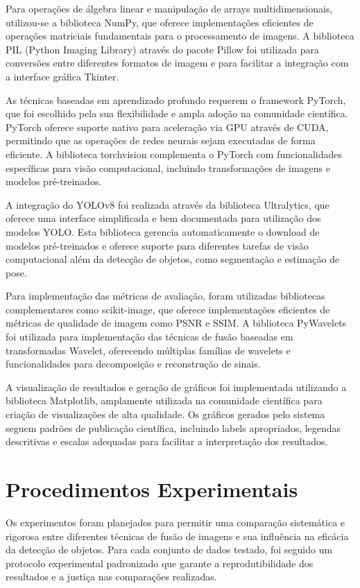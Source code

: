 Para operações de álgebra linear e manipulação de arrays multidimensionais, utilizou-se a biblioteca NumPy, que oferece implementações eficientes de operações matriciais fundamentais para o processamento de imagens. A biblioteca PIL (Python Imaging Library) através do pacote Pillow foi utilizada para conversões entre diferentes formatos de imagem e para facilitar a integração com a interface gráfica Tkinter.

As técnicas baseadas em aprendizado profundo requerem o framework PyTorch, que foi escolhido pela sua flexibilidade e ampla adoção na comunidade científica. PyTorch oferece suporte nativo para aceleração via GPU através de CUDA, permitindo que as operações de redes neurais sejam executadas de forma eficiente. A biblioteca torchvision complementa o PyTorch com funcionalidades específicas para visão computacional, incluindo transformações de imagens e modelos pré-treinados.

A integração do YOLOv8 foi realizada através da biblioteca Ultralytics, que oferece uma interface simplificada e bem documentada para utilização dos modelos YOLO. Esta biblioteca gerencia automaticamente o download de modelos pré-treinados e oferece suporte para diferentes tarefas de visão computacional além da detecção de objetos, como segmentação e estimação de pose.

Para implementação das métricas de avaliação, foram utilizadas bibliotecas complementares como scikit-image, que oferece implementações eficientes de métricas de qualidade de imagem como PSNR e SSIM. A biblioteca PyWavelets foi utilizada para implementação das técnicas de fusão baseadas em transformadas Wavelet, oferecendo múltiplas famílias de wavelets e funcionalidades para decomposição e reconstrução de sinais.

A visualização de resultados e geração de gráficos foi implementada utilizando a biblioteca Matplotlib, amplamente utilizada na comunidade científica para criação de visualizações de alta qualidade. Os gráficos gerados pelo sistema seguem padrões de publicação científica, incluindo labels apropriados, legendas descritivas e escalas adequadas para facilitar a interpretação dos resultados.

\section{Procedimentos Experimentais}

Os experimentos foram planejados para permitir uma comparação sistemática e rigorosa entre diferentes técnicas de fusão de imagens e sua influência na eficácia da detecção de objetos. Para cada conjunto de dados testado, foi seguido um protocolo experimental padronizado que garante a reprodutibilidade dos resultados e a justiça nas comparações realizadas.

